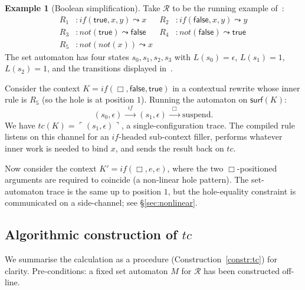 \documentclass[11pt]{article}
\theoremstyle{plain}
\theoremstyle{definition}
\newtheorem{example}[theorem]{Example}
\theoremstyle{remark}
\newcommand{\reflect}[1]{\ulcorner #1 \urcorner}
\newcommand{\rew}{\leadsto}
\newcommand{\surface}{\mathsf{surf}}
\newcommand{\true}{\mathsf{true}}
\newcommand{\false}{\mathsf{false}}
\begin{document}
\begin{example}[Boolean simplification]\label{ex:if-not}
Take $\mathcal{R}$ to be the running example
of~\cite[Ex.~8]{BouwmanErkens2022}:
\begin{align*}
  R_{1} &: \mathit{if}(\true, x, y) \rew x &
  R_{2} &: \mathit{if}(\false, x, y) \rew y \\
  R_{3} &: \mathit{not}(\true) \rew \false &
  R_{4} &: \mathit{not}(\false) \rew \true \\
  R_{5} &: \mathit{not}(\mathit{not}(x)) \rew x &&
\end{align*}
The set automaton has four states $s_{0}, s_{1}, s_{2}, s_{3}$ with
$L(s_{0}) = \epsilon$, $L(s_{1}) = 1$, $L(s_{2}) = 1$, and the transitions
displayed in~\cite[Fig.~3]{BouwmanErkens2022}.
\par\medskip\noindent
Consider the context $K = \mathit{if}(\Box, \false, \true)$ in a
contextual rewrite whose inner rule is $R_{5}$ (so the hole is at position
$1$). Running the automaton on $\surface(K)$:
\[
  (s_{0}, \epsilon) \xrightarrow{\;\;\mathit{if}\;\;}
  (s_{1}, \epsilon) \xrightarrow{\;\;\Box\;\;}
  \text{suspend}.
\]
We have $tc(K) = \reflect{(s_{1}, \epsilon)}$, a single-configuration trace.
The compiled rule listens on this channel for an $\mathit{if}$-headed
sub-context filler, performs whatever inner work is needed to bind $x$, and
sends the result back on $tc$.
\par\medskip\noindent
Now consider the context $K' = \mathit{if}(\Box, e, e)$, where the two
$\Box$-positioned arguments are required to coincide (a non-linear hole
pattern). The set-automaton trace is the same up to position $1$, but the
hole-equality constraint is communicated on a side-channel; see
\S\ref{sec:nonlinear}.
\end{example}

\subsection{Algorithmic construction of $tc$}\label{ssec:algorithm}

We summarise the calculation as a procedure (Construction~\ref{constr:tc}) for
clarity. Pre-conditions: a fixed set automaton $M$ for $\mathcal{R}$ has
been constructed off-line.
\end{document}
